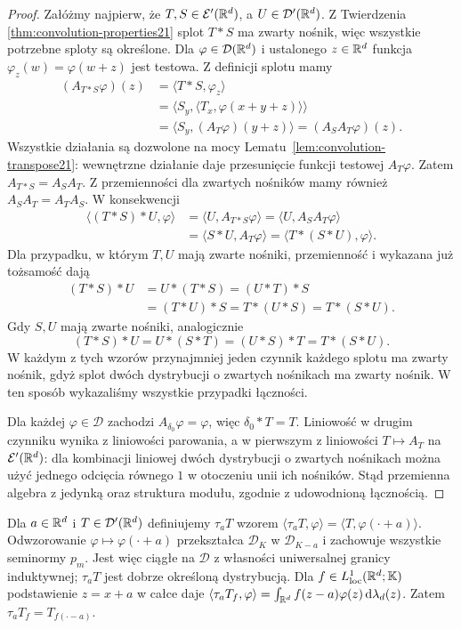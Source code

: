 \begin{proof}
Załóżmy najpierw, że $T,S\in\mathcal E'(\mathbb R^d)$,
a $U\in\mathcal D'(\mathbb R^d)$. Z Twierdzenia~
\ref{thm:convolution-properties21} splot $T*S$ ma zwarty
nośnik, więc wszystkie potrzebne sploty są określone.
Dla $\varphi\in\mathcal D(\mathbb R^d)$ i ustalonego $z\in\mathbb R^d$
funkcja $\varphi_z(w)=\varphi(w+z)$ jest testowa.
Z definicji splotu mamy
\[
\begin{aligned}
 (A_{T*S}\varphi)(z)
 &=\langle T*S,\varphi_z\rangle\\
 &=\langle S_y,\langle T_x,\varphi(x+y+z)\rangle\rangle\\
 &=\langle S_y,(A_T\varphi)(y+z)\rangle
 =(A_S A_T\varphi)(z).
\end{aligned}
\]
Wszystkie działania są dozwolone na mocy
Lematu~\ref{lem:convolution-transpose21}: wewnętrzne
działanie daje przesunięcie funkcji testowej $A_T\varphi$.
Zatem $A_{T*S}=A_S A_T$. Z przemienności dla zwartych
nośników mamy również $A_S A_T=A_T A_S$.
W konsekwencji
\[
\begin{aligned}
 \langle (T*S)*U,\varphi\rangle
 &=\langle U,A_{T*S}\varphi\rangle
 =\langle U,A_S A_T\varphi\rangle\\
 &=\langle S*U,A_T\varphi\rangle
 =\langle T*(S*U),\varphi\rangle .
\end{aligned}
\]
Dla przypadku, w którym $T,U$ mają zwarte nośniki,
przemienność i wykazana już tożsamość dają
\[
\begin{aligned}
 (T*S)*U&=U*(T*S)=(U*T)*S\\
 &=(T*U)*S=T*(U*S)=T*(S*U).
\end{aligned}
\]
Gdy $S,U$ mają zwarte nośniki, analogicznie
\[
 (T*S)*U=U*(S*T)=(U*S)*T=T*(S*U).
\]
W każdym z tych wzorów przynajmniej jeden czynnik
każdego splotu ma zwarty nośnik, gdyż splot dwóch
dystrybucji o zwartych nośnikach ma zwarty nośnik.
W ten sposób wykazaliśmy wszystkie przypadki łączności.

Dla każdej $\varphi\in\mathcal D$ zachodzi
$A_{\delta_0}\varphi=\varphi$, więc $\delta_0*T=T$.
Liniowość w drugim czynniku wynika z liniowości
parowania, a w pierwszym z liniowości
$T\mapsto A_T$ na $\mathcal E'(\mathbb R^d)$: dla kombinacji
liniowej dwóch dystrybucji o zwartych nośnikach można
użyć jednego odcięcia równego $1$ w otoczeniu unii
ich nośników.
Stąd przemienna algebra z jedynką oraz struktura
modułu, zgodnie z udowodnioną łącznością.
\end{proof}

\begin{definicja}
\label{def:translation21}
Dla $a\in\mathbb R^d$ i $T\in\mathcal D'(\mathbb R^d)$ definiujemy
$\tau_aT$ wzorem
$\langle\tau_aT,\varphi\rangle=
\langle T,\varphi(\cdot+a)\rangle$.
Odwzorowanie $\varphi\mapsto\varphi(\cdot+a)$
przekształca $\mathcal D_K$ w $\mathcal D_{K-a}$ i
zachowuje wszystkie seminormy $p_m$. Jest więc ciągłe
na $\mathcal D$ z własności uniwersalnej granicy
induktywnej; $\tau_aT$ jest dobrze określoną dystrybucją.
Dla $f\in L^1_{\mathrm{loc}}(\mathbb R^d;\mathbb K)$ podstawienie
$z=x+a$ w całce daje
$\langle\tau_aT_f,\varphi\rangle
=\int_{\mathbb R^d}f(z-a)\varphi(z)\,\mathrm d\lambda_d(z)$.
Zatem $\tau_aT_f=T_{f(\cdot-a)}$.
\end{definicja}

